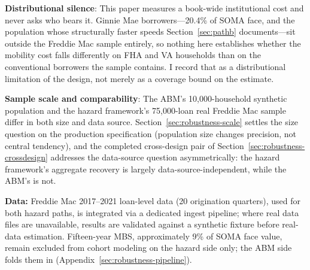 \documentclass[12pt]{article}
\begin{document}
\textbf{Distributional silence}: This paper measures a book-wide institutional cost and never asks who bears it. Ginnie Mae borrowers---20.4\% of SOMA face, and the population whose structurally faster speeds Section~\ref{sec:pathb} documents---sit outside the Freddie Mac sample entirely, so nothing here establishes whether the mobility cost falls differently on FHA and VA households than on the conventional borrowers the sample contains. I record that as a distributional limitation of the design, not merely as a coverage bound on the estimate.

\textbf{Sample scale and comparability}: The ABM's 10,000-household synthetic population and the hazard framework's 75,000-loan real Freddie Mac sample differ in both size and data source. Section~\ref{sec:robustness-scale} settles the size question on the production specification (population size changes precision, not central tendency), and the completed cross-design pair of Section~\ref{sec:robustness-crossdesign} addresses the data-source question asymmetrically: the hazard framework's aggregate recovery is largely data-source-independent, while the ABM's is not.

\textbf{Data:} Freddie Mac 2017--2021 loan-level data (20 origination quarters), used for both hazard paths, is integrated via a dedicated ingest pipeline; where real data files are unavailable, results are validated against a synthetic fixture before real-data estimation. Fifteen-year MBS, approximately 9\% of SOMA face value, remain excluded from cohort modeling on the hazard side only; the ABM side folds them in (Appendix~\ref{sec:robustness-pipeline}).
\end{document}
